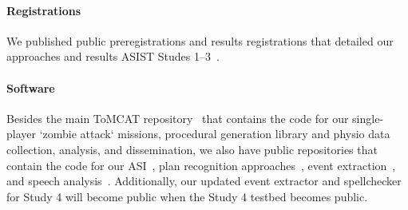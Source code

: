 \documentclass[11pt,article,oneside]{memoir}
\begin{document}
\paragraph{Registrations} We published public preregistrations and results
registrations that detailed our approaches and results ASIST Studes
1--3~\citep{study_1_preregistration_and_results, study_2_preregistration,
    study_2_results, study_3_preregistration, study_3_results}.

\paragraph{Software} Besides the main ToMCAT repository~\citep{tomcat_repo}
that contains the code for our single-player `zombie attack` missions,
procedural generation library and physio data collection, analysis, and
dissemination, we also have public repositories that contain the code for our
ASI~\citep{tomcat_asi}, plan recognition approaches~\citep{tomcat_planrec},
event extraction~\citep{tomcat-text}, and speech
analysis~\citep{tomcat_speech}. Additionally, our updated event extractor and
spellchecker for Study 4 will become public when the Study 4 testbed becomes
public.


\newpage
\printbibliography
\end{document}
